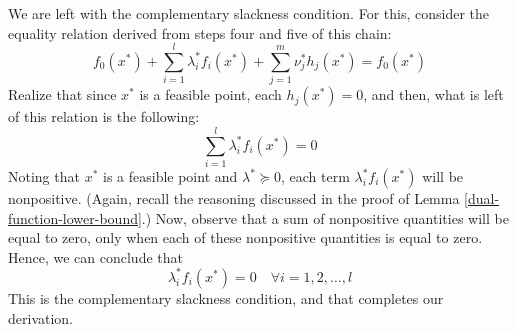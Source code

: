 \documentclass[a4paper]{article}
\theoremstyle{definition}
\begin{document}
We are left with the complementary slackness condition.
For this, consider the equality relation derived from steps four and five of this chain:
\begin{equation*}
	f_0(x^*) + \sum_{i=1}^l \lambda_i^* f_i(x^*) + \sum_{j=1}^m \nu_j^* h_j(x^*) = f_0(x^*)
\end{equation*}
Realize that since $x^*$ is a feasible point, each $h_j(x^*) = 0$, and then, what is left of this relation is the following:
\begin{equation*}
	\sum_{i=1}^l \lambda_i^* f_i(x^*) = 0
\end{equation*}
Noting that $x^*$ is a feasible point and $\lambda^* \succeq 0$, each term $\lambda_i^* f_i(x^*)$ will be nonpositive.
(Again, recall the reasoning discussed in the proof of Lemma \ref{dual-function-lower-bound}.)
Now, observe that a sum of nonpositive quantities will be equal to zero, only when each of these nonpositive quantities is equal to zero.
Hence, we can conclude that
\begin{equation*}
	\lambda_i^* f_i(x^*) = 0 \quad \forall i = 1, 2, \dots, l
\end{equation*}
This is the complementary slackness condition, and that completes our derivation.
\end{document}
